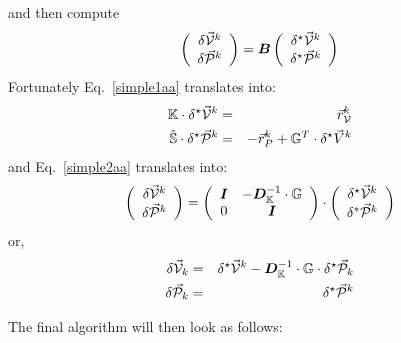 and then compute
\begin{equation}
\left(
\begin{array}{c}
\delta \vec{\cal V}^k \\ 
\delta \vec{\cal P}^k
\end{array}
\right)
=
{\bm B}  
\left(
\begin{array}{c}
\delta^\star \vec{\cal V}^k \\ 
\delta^\star \vec{\cal P}^k
\end{array}
\right)
\label{simple2aa}
\end{equation}
Fortunately Eq.~\eqref{simple1aa} translates into:
\begin{eqnarray}
{\mathbb{K}} \cdot \delta^\star \vec{\cal V}^k &=&  \vec{r}_{\cal V}^k   \\
\hat{{\mathbb{S}}} \cdot  \delta^\star \vec{\cal P}^k &=&  - \vec{r}_P^k + {\mathbb{G}}^T \cdot \delta^\star \vec{V}^k 
\end{eqnarray}
and Eq.~\eqref{simple2aa} translates into:
\[
\left(
\begin{array}{c}
\delta \vec{\cal V}^k \\ 
\delta \vec{\cal P}^k
\end{array}
\right)
=
\left(
\begin{array}{cc}
{\bm I} & -{\bm D}_{\mathbb{K}}^{-1}\cdot {\mathbb{G}} \\
0 & {\bm I}
\end{array}
\right)
\cdot
\left(
\begin{array}{c}
\delta^\star \vec{\cal V}^k \\ 
\delta^* \vec{\cal P}^k
\end{array}
\right)
\]
or, 
\begin{eqnarray}
\delta \vec{\cal V}_k &=& \delta^\star \vec{\cal V}^k 
-{\bm D}_{\mathbb{K}}^{-1}\cdot {\mathbb{G}} \cdot\delta^\star \vec{\cal P}_k \\
\delta \vec{\cal P}_k &=& \delta^\star \vec{\cal P}^k
\end{eqnarray}


The final algorithm will then look as follows:


